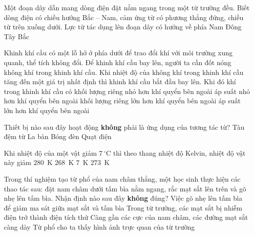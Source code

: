 	\begin{ex}%
		Một đoạn dây dẫn mang dòng điện đặt nằm ngang trong một từ trường đều. Biết dòng điện có chiều hướng Bắc -- Nam, cảm ứng từ có phương thẳng đứng, chiều từ trên xuống dưới. Lực từ tác dụng lên đoạn dây có hướng về phía
		\choice
		{Nam}
		{\True Đông}
		{Tây}
		{Bắc}
	\end{ex}

	\begin{ex}%
		Khinh khí cầu có một lỗ hở ở phía dưới để trao đổi khí với môi trường xung quanh, thể tích không đổi. Để khinh khí cầu bay lên, người ta cần đốt nóng không khí trong khinh khí cầu. Khi nhiệt độ của không khí trong khinh khí cầu tăng đến một giá trị nhất định thì khinh khí cầu bắt đầu bay lên. Khi đó khí trong khinh khí cầu có
		\choice
		{\True khối lượng riêng nhỏ hơn khí quyển bên ngoài}
		{áp suất nhỏ hơn khí quyển bên ngoài}
		{khối lượng riêng lớn hơn khí quyển bên ngoài}
		{áp suất lớn hơn khí quyển bên ngoài}
	\end{ex}

	\begin{ex}%
		Thiết bị nào sau đây hoạt động \textbf{không} phải là ứng dụng của tương tác từ?
		\choice
		{Tàu đệm từ}
		{La bàn}
		{\True Bóng đèn}
		{Quạt điện}
	\end{ex}

	\begin{ex}%
		Khi nhiệt độ của một vật giảm $7\,^\circ\text{C}$ thì theo thang nhiệt độ Kelvin, nhiệt độ vật này giảm
		\choice
		{$280$~K}
		{$268$~K}
		{\True $7$~K}
		{$273$~K}
	\end{ex}

	\begin{ex}%
		Trong thí nghiệm tạo từ phổ của nam châm thẳng, một học sinh thực hiện các thao tác sau: đặt nam châm dưới tấm bìa nằm ngang, rắc mạt sắt lên trên và gõ nhẹ lên tấm bìa. Nhận định nào sau đây \textbf{không} đúng?
		\choice
		{Việc gõ nhẹ lên tấm bìa để giảm ma sát giữa mạt sắt và tấm bìa}
		{\True Trong từ trường, các mạt sắt bị nhiễm điện trở thành điện tích thử}
		{Càng gần các cực của nam châm, các đường mạt sắt càng dày}
		{Từ phổ cho ta thấy hình ảnh trực quan của từ trường}
	\end{ex}

